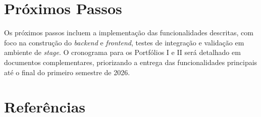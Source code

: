 \documentclass[12pt, a4paper]{article}
\begin{document}
\section{Próximos Passos}
\begin{spacing}{1.5}
Os próximos passos incluem a implementação das funcionalidades descritas, com foco na construção do \textit{backend} e \textit{frontend}, testes de integração e validação em ambiente de \textit{stage}. O cronograma para os Portfólios I e II será detalhado em documentos complementares, priorizando a entrega das funcionalidades principais até o final do primeiro semestre de 2026.
\end{spacing}

\section{Referências}
\end{document}
